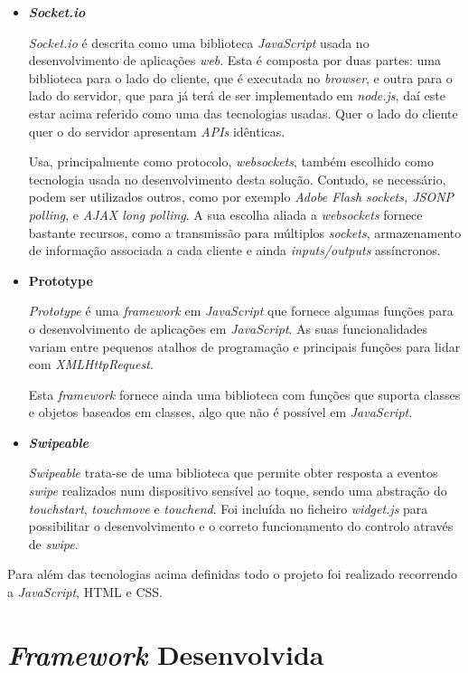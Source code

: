 \begin{itemize}
\item \textbf{\textit{Socket.io}}

\textit{Socket.io} é descrita como uma biblioteca \textit{JavaScript} usada no desenvolvimento de aplicações \textit{web}. Esta é composta por duas partes: uma biblioteca para o lado do cliente, que é executada no \textit{browser}, e outra para o lado do servidor, que para já terá de ser implementado em \textit{node.js}, daí este estar acima referido como uma das tecnologias usadas. Quer o lado do cliente quer o do servidor apresentam \textit{APIs} idênticas.

Usa, principalmente como protocolo, \textit{websockets}, também escolhido como tecnologia usada no desenvolvimento desta solução. Contudo, se necessário, podem ser utilizados outros, como por exemplo \textit{Adobe Flash sockets, JSONP polling}, e \textit{AJAX long polling}.
A sua escolha aliada a \textit{websockets} fornece bastante recursos, como a transmissão para múltiplos \textit{sockets}, armazenamento de informação associada a cada cliente e ainda \textit{inputs/outputs} assíncronos.

\item \textbf{Prototype}

\textit{Prototype} é uma \textit{framework} em \textit{JavaScript} que fornece algumas funções para o desenvolvimento de aplicações em \textit{JavaScript}. As suas funcionalidades variam entre pequenos atalhos de programação e principais funções para lidar com \textit{XMLHttpRequest}.

Esta \textit{framework} fornece ainda uma biblioteca com funções que suporta classes e objetos baseados em classes, algo que não é possível em \textit{JavaScript}.

\item \textbf{\textit{Swipeable}}

\textit{Swipeable} trata-se de uma biblioteca que permite obter resposta a eventos \textit{swipe} realizados num dispositivo sensível ao toque, sendo uma abstração do \textit{touchstart}, \textit{touchmove} e \textit{touchend}.
Foi incluída no ficheiro \textit{widget.js} para possibilitar o desenvolvimento e o correto funcionamento do controlo através de \textit{swipe}.

\end{itemize}

Para além das tecnologias acima definidas todo o projeto foi realizado recorrendo a \textit{JavaScript}, HTML e CSS.


\section{\textit{Framework} Desenvolvida} \label{sec:framework}

